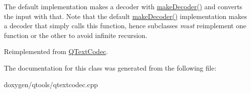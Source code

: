 The default implementation makes a decoder with \mbox{\hyperlink{class_q_text_codec_from_i_o_d_ae5184561209ee0771ad28d3888a2a89c}{make\+Decoder()}} and converts the input with that. Note that the default \mbox{\hyperlink{class_q_text_codec_from_i_o_d_ae5184561209ee0771ad28d3888a2a89c}{make\+Decoder()}} implementation makes a decoder that simply calls this function, hence subclasses {\itshape must} reimplement one function or the other to avoid infinite recursion. 

Reimplemented from \mbox{\hyperlink{class_q_text_codec_aafe2c454ae7cbbf3d84a7ca26f775c49}{Q\+Text\+Codec}}.



The documentation for this class was generated from the following file\+:\begin{DoxyCompactItemize}
\item 
doxygen/qtools/qtextcodec.\+cpp\end{DoxyCompactItemize}

